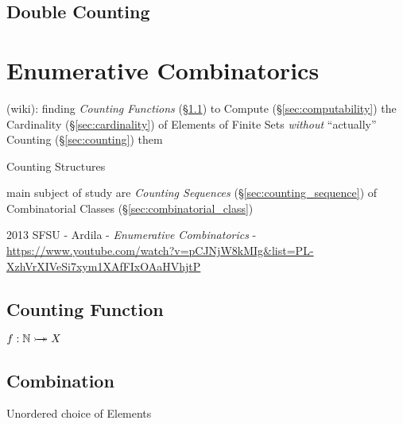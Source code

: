 \subsection{Double Counting}\label{sec:double_counting}



\section{Enumerative Combinatorics}\label{sec:enumerative_combinatorics}

(wiki): finding \emph{Counting Functions} (\S\ref{sec:counting_function}) to
Compute (\S\ref{sec:computability}) the Cardinality (\S\ref{sec:cardinality}) of
Elements of Finite Sets \emph{without} ``actually'' Counting
(\S\ref{sec:counting}) them

Counting Structures

main subject of study are \emph{Counting Sequences}
(\S\ref{sec:counting_sequence}) of Combinatorial Classes
(\S\ref{sec:combinatorial_class})

2013 SFSU - Ardila - \emph{Enumerative Combinatorics} -
\url{https://www.youtube.com/watch?v=pCJNjW8kMIg&list=PL-XzhVrXIVeSi7xym1XAfFIxOAaHVhjtP}



\subsection{Counting Function}\label{sec:counting_function}

$f : \mathbb{N} \rightarrowtail\hspace{-8pt}\twoheadrightarrow X$



\subsection{Combination}\label{sec:combination}

Unordered choice of Elements

